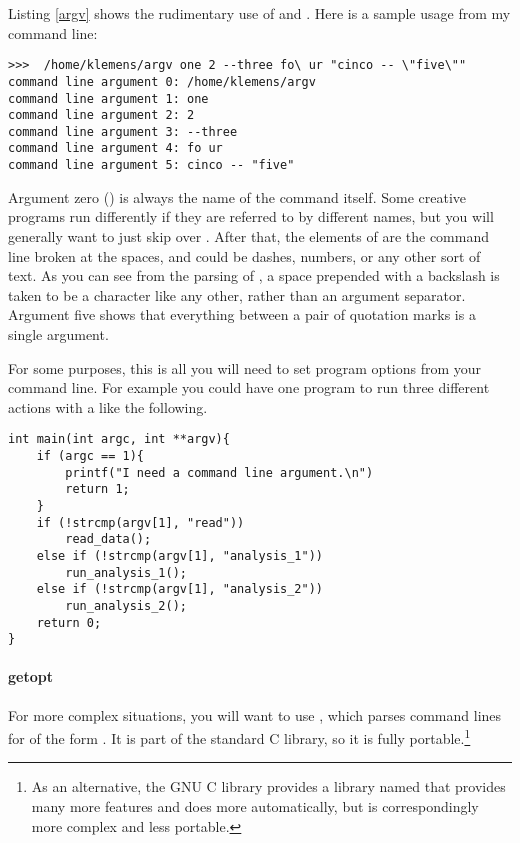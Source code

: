 
Listing \ref{argv} shows the rudimentary use of  and .
Here is a sample usage from my command line:
\begin{lstlisting}
>>>  /home/klemens/argv one 2 --three fo\ ur "cinco -- \"five\""
command line argument 0: /home/klemens/argv
command line argument 1: one
command line argument 2: 2
command line argument 3: --three
command line argument 4: fo ur
command line argument 5: cinco -- "five"
\end{lstlisting}
Argument zero () is always the name of the command itself.
Some creative programs run differently if they are referred to by
different names, but you will generally want to just skip over .
After that, the elements of  are the command line broken at
the spaces, and could be dashes, numbers, or any other sort of text. As
you can see from the parsing of , a space prepended
with a backslash is taken to be a character like any other, rather than an
argument separator. Argument five shows that everything between a pair
of quotation marks is a single argument.

For some purposes, this is all you will need to set program options from your
command line. For example you could have one program to run three
different actions with a  like the following.
\begin{lstlisting}
int main(int argc, int **argv){
    if (argc == 1){
        printf("I need a command line argument.\n")
        return 1;
    }
    if (!strcmp(argv[1], "read"))
        read_data();
    else if (!strcmp(argv[1], "analysis_1"))
        run_analysis_1();
    else if (!strcmp(argv[1], "analysis_2"))
        run_analysis_2();
    return 0;
}
\end{lstlisting}

\lstset{numbers=left, numberstyle=\scshape}
\lstset{numbers=none}

\paragraph{getopt}
For more complex situations, you will want to use , which
parses command lines for  of the form .  It is
part of the standard C library, so it is fully portable.\footnote{As
an alternative, the GNU C library provides a library named 
that provides many more features and does more automatically, but is
correspondingly more complex and less portable.} 

